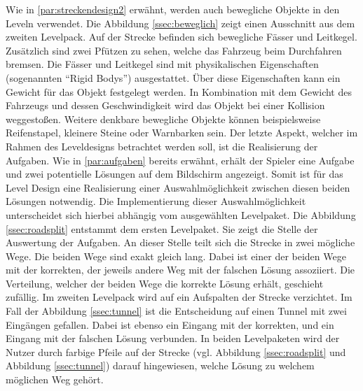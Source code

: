 		Wie in \ref{par:streckendesign2} erwähnt, werden auch bewegliche Objekte in den Leveln verwendet. Die Abbildung \ref{ssec:beweglich} zeigt einen Ausschnitt aus dem zweiten Levelpack. Auf der Strecke befinden sich bewegliche Fässer und Leitkegel. Zusätzlich sind zwei Pfützen zu sehen, welche das Fahrzeug beim Durchfahren bremsen. Die Fässer und Leitkegel sind mit physikalischen Eigenschaften (sogenannten \enquote{Rigid Bodys}) ausgestattet. Über diese Eigenschaften kann ein Gewicht für das Objekt festgelegt werden. In Kombination mit dem Gewicht des Fahrzeugs und dessen Geschwindigkeit wird das Objekt bei einer Kollision weggestoßen. Weitere denkbare bewegliche Objekte können beispielsweise Reifenstapel, kleinere Steine oder Warnbarken sein.
		Der letzte Aspekt, welcher im Rahmen des Leveldesigns betrachtet werden soll, ist die Realisierung der Aufgaben. Wie in \ref{par:aufgaben} bereits erwähnt, erhält der Spieler eine Aufgabe und zwei potentielle Lösungen auf dem Bildschirm angezeigt. Somit ist für das Level Design eine Realisierung einer Auswahlmöglichkeit zwischen diesen beiden Lösungen notwendig. Die Implementierung dieser Auswahlmöglichkeit unterscheidet sich hierbei abhängig vom ausgewählten Levelpaket.
		Die Abbildung \ref{ssec:roadsplit} entstammt dem ersten Levelpaket. Sie zeigt die Stelle der Auswertung der Aufgaben. An dieser Stelle teilt sich die Strecke in zwei mögliche Wege. Die beiden Wege sind exakt gleich lang. Dabei ist einer der beiden Wege mit der korrekten, der jeweils andere Weg mit der falschen Lösung assoziiert. Die Verteilung, welcher der beiden Wege die korrekte Lösung erhält, geschieht zufällig.
		Im zweiten Levelpack wird auf ein Aufspalten der Strecke verzichtet. Im Fall der Abbildung \ref{ssec:tunnel} ist die Entscheidung auf einen Tunnel mit zwei Eingängen gefallen. Dabei ist ebenso ein Eingang mit der korrekten, und ein Eingang mit der falschen Lösung verbunden. In beiden Levelpaketen wird der Nutzer durch farbige Pfeile auf der Strecke (vgl. Abbildung \ref{ssec:roadsplit} und Abbildung \ref{ssec:tunnel}) darauf hingewiesen, welche Lösung zu welchem möglichen Weg gehört.

